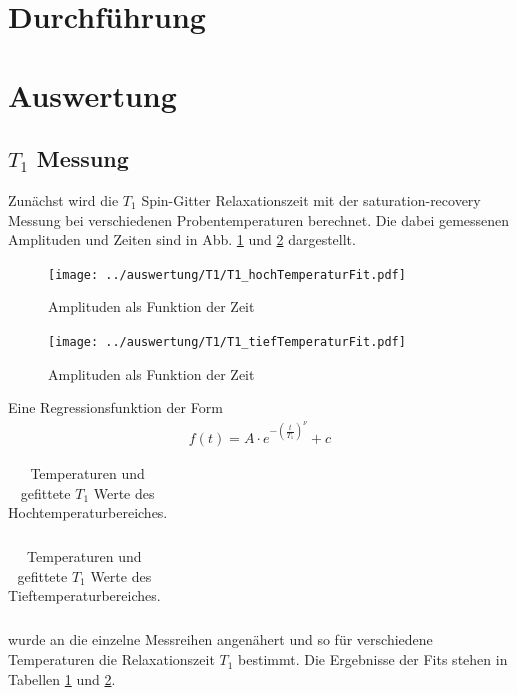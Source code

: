 \section{Durchführung}

\section{Auswertung}
\subsection{$T_1$ Messung}
Zunächst wird die $T_1$ Spin-Gitter Relaxationszeit mit der saturation-recovery Messung bei verschiedenen Probentemperaturen berechnet. Die dabei gemessenen Amplituden und Zeiten sind in Abb. \ref{pic_T1_hoch} und \ref{pic_T1_tief} dargestellt. 
\begin{figure}[htbp]
	\texttt{[image: ../auswertung/T1/T1\_hochTemperaturFit.pdf]}
	\caption{Amplituden als Funktion der Zeit}
	\label{pic_T1_hoch}
\end{figure}
\begin{figure}[htbp]
	\texttt{[image: ../auswertung/T1/T1\_tiefTemperaturFit.pdf]}
	\caption{Amplituden als Funktion der Zeit}
	\label{pic_T1_tief}
\end{figure}

Eine Regressionsfunktion der Form 
\begin{align}
	f(t) = A\cdot e^{-\left(\frac{t}{T_1}\right)^\nu}+c
\end{align}
\begin{table}[htbp]
	\begin{tabular}{| >{$}c<{$} | >{$}c<{$} | >{$}c<{$} |}
		
	\end{tabular}
	\caption{Temperaturen und gefittete $T_1$ Werte des Hochtemperaturbereiches.}
	\label{tab:T1_hoch}
\end{table}
\begin{table}[htbp]
	\begin{tabular}{| >{$}c<{$} | >{$}c<{$} | >{$}c<{$} |}
		
	\end{tabular}
	\caption{Temperaturen und gefittete $T_1$ Werte des Tieftemperaturbereiches.}
	\label{tab:T1_tief}
\end{table}
wurde an die einzelne Messreihen angenähert und so für verschiedene Temperaturen die Relaxationszeit $T_1$ bestimmt. Die Ergebnisse der Fits stehen in Tabellen \ref{tab:T1_hoch} und \ref{tab:T1_tief}.

